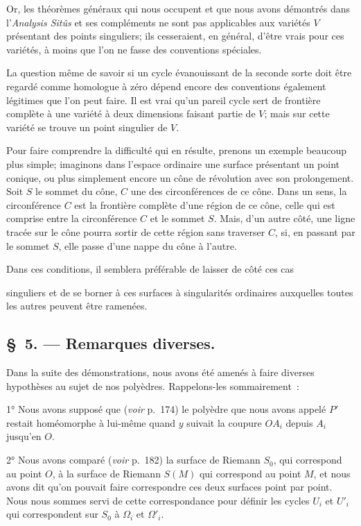\documentclass{article}
\begin{document}
Or, les théorèmes généraux qui nous occupent et que nous avons démontrés dans l'\emph{Analysis Sitûs} et ses compléments ne sont pas applicables aux variétés $V$ présentant des points singuliers; ils cesseraient, en général, d'être vrais pour ces variétés, à moins que l'on ne fasse des conventions spéciales.

La question même de savoir si un cycle évanouissant de la seconde sorte doit être regardé comme homologue à zéro dépend encore des conventions également légitimes que l'on peut faire. Il est vrai qu'un pareil cycle sert de frontière complète à une variété à deux dimensions faisant partie de $V$; mais sur cette variété se trouve un point singulier de $V$.

Pour faire comprendre la difficulté qui en résulte, prenons un exemple beaucoup plus simple; imaginons dans l'espace ordinaire une surface présentant un point conique, ou plus simplement encore un cône de révolution avec son prolongement. Soit $S$ le sommet du cône, $C$ une des circonférences de ce cône. Dans un sens, la circonférence $C$ est la frontière complète d'une région de ce cône, celle qui est comprise entre la circonférence $C$ et le sommet $S$. Mais, d'un autre côté, une ligne tracée sur le cône pourra sortir de cette région sans traverser $C$, si, en passant par le sommet $S$, elle passe d'une nappe du cône à l'autre.

Dans ces conditions, il semblera préférable de laisser de côté ces cas

singuliers et de se borner à ces surfaces à singularités ordinaires auxquelles toutes les autres peuvent être ramenées.

\subsection*{\S~5. --- Remarques diverses.}

Dans la suite des démonstrations, nous avons été amenés à faire diverses hypothèses au sujet de nos polyèdres. Rappelons-les sommairement~:

1° Nous avons supposé que (\emph{voir} p.\ 174) le polyèdre que nous avons appelé $P'$ restait homéomorphe à lui-même quand $y$ suivait la coupure $OA_{i}$ depuis $A_{i}$ jusqu'en $O$.

2° Nous avons comparé (\emph{voir} p.\ 182) la surface de Riemann $S_{0}$, qui correspond au point $O$, à la surface de Riemann $S(M)$ qui correspond au point $M$, et nous avons dit qu'on pouvait faire correspondre ces deux surfaces point par point. Nous nous sommes servi de cette correspondance pour définir les cycles $U_{i}$ et $U'_{i}$ qui correspondent sur $S_{0}$ à $\Omega_{i}$ et $\Omega'_{i}$.
\end{document}
